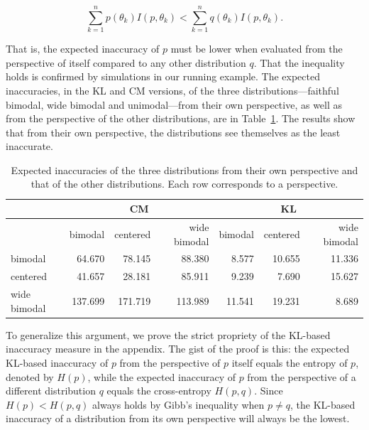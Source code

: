 \documentclass[
  letterpaper,
  DIV=11,
  numbers=noendperiod]{scrartcl}
\begin{document}
\[ \sum_{k=1}^n  p(\theta_k) I(p, \theta_k) < \sum_{k=1}^n  q(\theta_k)I(p, \theta_k).\]

\noindent That is, the expected inaccuracy of \(p\) must be lower when
evaluated from the perspective of itself compared to any other
distribution \(q\). That the inequality holds is confirmed by
simulations in our running example. The expected inaccuracies, in the KL
and CM versions, of the three distributions---faithful bimodal, wide
bimodal and unimodal---from their own perspective, as well as from the
perspective of the other distributions, are in
\mbox{Table \ref{tbl:expected2}.} The results show that from their own
perspective, the distributions see themselves as the least inaccurate.

\begin{small}
\begin{table}[H]
\begin{tabular}{lrrrrrr}
& \multicolumn{3}{c}{CM} & \multicolumn{3}{c}{KL} \\
\toprule
  & bimodal & centered & wide bimodal & bimodal & centered & wide bimodal\\
\midrule
bimodal & 64.670 & 78.145 & 88.380 & 8.577 & 10.655 & 11.336\\
centered & 41.657 & 28.181 & 85.911 & 9.239 & 7.690 & 15.627\\
wide bimodal & 137.699 & 171.719 & 113.989 & 11.541 & 19.231 & 8.689\\
\bottomrule
\end{tabular}
\caption{Expected inaccuracies of the three distributions from their own perspective and that of the other distributions. Each row corresponds to a perspective.}
\label{tbl:expected2}
\end{table}
\end{small}

\noindent To generalize this argument, we prove the strict propriety of
the KL-based inaccuracy measure in the appendix. The gist of the proof
is this: the expected KL-based inaccuracy of \(p\) from the perspective
of \(p\) itself equals the entropy of \(p\), denoted by \(H(p)\), while
the expected inaccuracy of \(p\) from the perspective of a different
distribution \(q\) equals the cross-entropy \(H(p, q)\). Since
\(H(p) < H(p, q)\) always holds by Gibb's inequality when \(p\neq q\),
the KL-based inaccuracy of a distribution from its own perspective will
always be the lowest.
\end{document}
